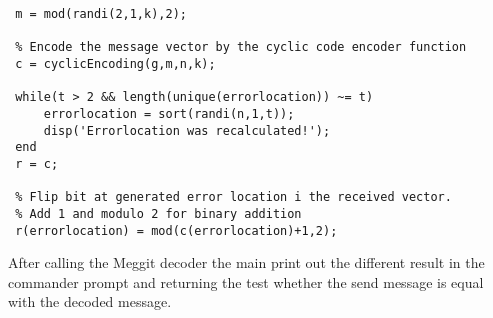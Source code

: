 \documentclass[Main]{subfiles}
\begin{document}
\begin{lstlisting}[caption=Generating vector, style=Code-Matlab, label=lst:GenerateVector]
 % Generate a message vector by using random numbers in GF(2))
 m = mod(randi(2,1,k),2);

 % Encode the message vector by the cyclic code encoder function
 c = cyclicEncoding(g,m,n,k);

 while(t > 2 && length(unique(errorlocation)) ~= t)
     errorlocation = sort(randi(n,1,t));
     disp('Errorlocation was recalculated!');
 end
 r = c;

 % Flip bit at generated error location i the received vector.
 % Add 1 and modulo 2 for binary addition
 r(errorlocation) = mod(c(errorlocation)+1,2);
\end{lstlisting}

\noindent After calling the Meggit decoder the main print out the different result in the commander prompt and returning the test whether the send message is equal with the decoded message.
\end{document}
